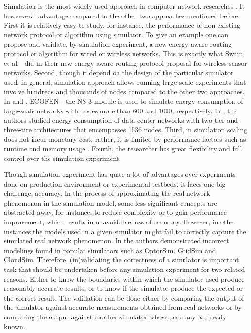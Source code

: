 Simulation is the most widely used approach in computer network researches \cite{DBLP:conf/icc/WeingartnerLW09}. It has several advantage compared to the other two approaches mentioned before. First it is relatively easy to study, for instance, the performance of non-existing network protocol or algorithm using simulator. To give an example one can propose and validate, by simulation experiment, a new energy-aware routing protocol or algorithm for wired or wireless networks. This is exactly what Swain et al.{\ }\cite{DBLP:conf/aina/SwainHC10} did in their new energy-aware routing protocol proposal for wireless sensor networks. Second, though it depend on the design of the particular simulator used, in general, simulation approach allows running large scale experiments that involve hundreds and thousands of nodes compared to the other two approaches. In \cite{DBLP:conf/wowmom/OrgerieLLL11} and \cite{DBLP:conf/cloudnet/CorneaOL14}, ECOFEN - the NS-3 module is used to simulate energy consumption of large-scale networks with nodes more than 600 and 1000, respectively. In \cite{DBLP:journals/tjs/KliazovichBK12}, the authors studied energy consumption of data center networks with two-tier and three-tire architectures that encompasses 1536 nodes. Third, in simulation scaling does not incur monetary cost, rather, it is limited by performance factors such as runtime and memory usage \cite{DBLP:conf/icc/WeingartnerLW09}. Fourth, the researcher has great flexibility and full control over the simulation experiment. 

Though simulation experiment has quite a lot of advantages over experiments done on production environment or experimental testbeds, it faces one big challenge, accuracy. In the process of approximating the real network phenomenon in the simulation model, some less significant concepts are abstracted away, for instance, to reduce complexity or to gain performance improvement, which results in unavoidable loss of accuracy. However, in other instances the models used in a given simulator might fail to correctly capture the simulated real network phenomenon. In \cite{DBLP:journals/tomacs/VelhoSCL13} the authors demonstrated incorrect modelings found in popular simulators such as OptorSim, GridSim and CloudSim. Therefore, (in)validating the correctness of a simulator is important task that should be undertaken before any simulation experiment for two related reasons. Either to know the boundaries within which the simulator used produce reasonably accurate results, or to know if the simulator produce the expected or the correct result. The validation can be done either by comparing the output of the simulator against accurate measurements obtained from real networks or by comparing the output against another simulator whose accuracy is already known\cite{DBLP:books/daglib/0076234}.
